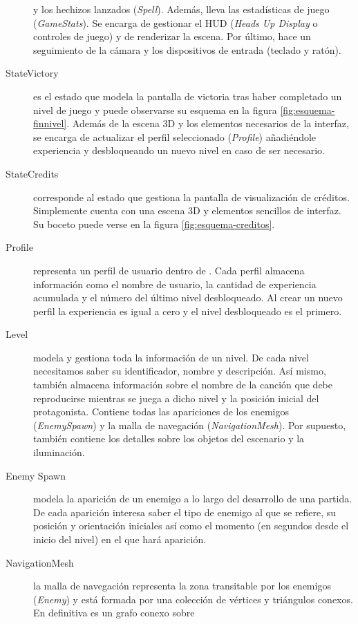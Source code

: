 \begin{description}
    y los hechizos lanzados (\textit{Spell}). Además, lleva las estadísticas
    de juego (\textit{GameStats}). Se encarga de gestionar el HUD
    (\textit{Heads Up Display} o controles de juego) y de renderizar la escena.
    Por último, hace un seguimiento de la cámara y los dispositivos de
    entrada (teclado y ratón).
    \item [StateVictory] es el estado que modela la pantalla de victoria
    tras haber completado un nivel de juego y puede observarse su esquema
    en la figura \ref{fig:esquema-finnivel}. Además de la escena 3D y los
    elementos necesarios de la interfaz, se encarga de actualizar el perfil
    seleccionado (\textit{Profile}) añadiéndole experiencia y desbloqueando
    un nuevo nivel en caso de ser necesario. 
    \item [StateCredits] corresponde al estado que gestiona la pantalla de
    visualización de créditos. Simplemente cuenta con una escena 3D y elementos
    sencillos de interfaz. Su boceto puede verse en la figura \ref{fig:esquema-creditos}.
    \item [Profile] representa un perfil de usuario dentro de \juego. Cada
    perfil almacena información como el nombre de usuario, la cantidad de
    experiencia acumulada y el número del último nivel desbloqueado. Al crear
    un nuevo perfil la experiencia es igual a cero y el nivel desbloqueado
    es el primero.
    \item [Level] modela y gestiona toda la información de un nivel. De cada
    nivel necesitamos saber su identificador, nombre y descripción. Así mismo,
    también almacena información sobre el nombre de la canción que debe reproducirse
    mientras se juega a dicho nivel y la posición inicial del protagonista.
    Contiene todas las apariciones de los enemigos (\textit{EnemySpawn}) y
    la malla de navegación (\textit{NavigationMesh}). Por supuesto, también
    contiene los detalles sobre los objetos del escenario y la iluminación.
    \item [Enemy Spawn] modela la aparición de un enemigo a lo largo del
    desarrollo de una partida. De cada aparición interesa saber el tipo
    de enemigo al que se refiere, su posición y orientación iniciales
    así como el momento (en segundos desde el inicio del nivel) en el que
    hará aparición.
    \item [NavigationMesh] la malla de navegación representa la zona transitable
    por los enemigos (\textit{Enemy}) y está formada por una colección
    de vértices y triángulos conexos. En definitiva es un grafo conexo sobre

\end{description}
